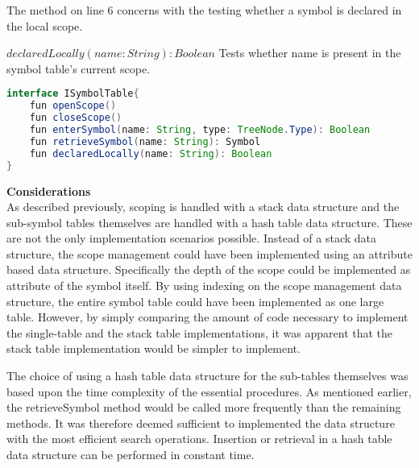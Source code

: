 The method on line 6 concerns with the testing whether a symbol is declared in the local scope.

$declaredLocally(name: String): Boolean$ Tests whether name is present in the symbol table's current scope.

\begin{lstlisting}[language=java,label=lis:STInterface,caption=The interface which all symbol table implementations must implement.]
interface ISymbolTable{
	fun openScope()
	fun closeScope()
	fun enterSymbol(name: String, type: TreeNode.Type): Boolean
	fun retrieveSymbol(name: String): Symbol
	fun declaredLocally(name: String): Boolean
}
\end{lstlisting}

\textbf{Considerations}\\
As described previously, scoping is handled with a stack data structure and the sub-symbol tables themselves are handled with a hash table data structure.
These are not the only implementation scenarios possible.
Instead of a stack data structure, the scope management could have been implemented using an attribute based data structure.
Specifically the depth of the scope could be implemented as attribute of the symbol itself.
By using indexing on the scope management data structure, the entire symbol table could have been implemented as one large table.
However, by simply comparing the amount of code necessary to implement the single-table and the stack table implementations, it was apparent that the stack table implementation would be simpler to implement.

The choice of using a hash table data structure for the sub-tables themselves was based upon the time complexity of the essential procedures.
As mentioned earlier, the retrieveSymbol method would be called more frequently than the remaining methods.
It was therefore deemed sufficient to implemented the data structure with the most efficient search operations.
Insertion or retrieval in a hash table data structure can be performed in constant time.
